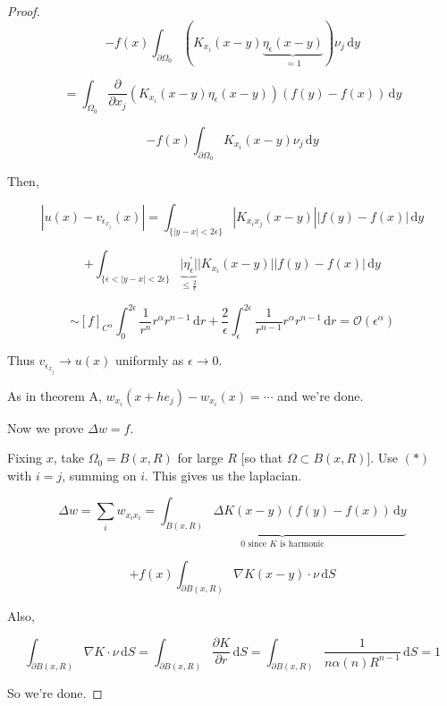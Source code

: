 \documentclass{article}
\theoremstyle{definition}
\begin{document}
\begin{proof}
    \[
        - f(x) \int_{\partial \Omega_0} (K_{x_i}(x-y) \underbrace{ \eta_{\epsilon} (x-y) }_{=1}) \nu_j \,\mathrm{d}y
    \]

    \[
        =\int_{\Omega_0} \frac{\partial}{\partial x_j} \left( K_{x_i} (x-y) \eta_{\epsilon} (x-y) \right) (f(y) - f(x)) \,\mathrm{d}y 
    \]

    \[
        - f(x) \int_{\partial \Omega_0} K_{x_i}(x-y)\nu_j \,\mathrm{d}y
    \]

    Then,

    \[
        \left\vert u(x) - v_{\epsilon_{x_j}} (x) \right\vert = \int_{\{ \vert y - x \vert < 2 \epsilon \} } \left\vert K_{x_i x_j} (x-y) \right\vert \left\vert f(y) - f(x) \right\vert  \,\mathrm{d}y 
    \]

    \[
        + \int_{\{ \epsilon < \vert y - x \vert < 2 \epsilon \} } \underbrace{\vert \eta_{\epsilon} ^{\prime} \vert}_{\leq \frac{2}{\epsilon}} \vert K_{x_i} (x-y) \vert \vert f(y) - f(x) \vert \,\mathrm{d}y 
    \]

    \[
        \sim [f]_{C^\alpha} \int_{0}^{2\epsilon} \frac{1}{r^n} r^\alpha r^{n-1} \,\mathrm{d}r + \frac{2}{\epsilon} \int_{\epsilon}^{2\epsilon} \frac{1}{r^{n-1}} r^\alpha r^{n-1}  \,\mathrm{d}r = \mathcal{O} (\epsilon^\alpha)
    \]

    Thus \(v_{\epsilon_{x_j}} \to u(x) \) uniformly as \(\epsilon \to 0\).
    
    As in theorem A, \(w_{x_i} (x+ he_j) - w_{x_i} (x) = \cdots\) and we're done.

    Now we prove \(\Delta w = f\).

    Fixing \(x\), take \(\Omega_0 = B(x,R)\) for large \(R\) [so that \(\Omega \subset B(x,R)\)]. Use \((\ast)\) with \(i = j\), summing on \(i\). This gives us the laplacian.

    \[
        \Delta w = \sum_{i} w_{x_i x_i} = \underbrace{\int_{B(x,R)} \Delta K(x-y) (f(y) - f(x)) \,\mathrm{d}y}_{0 \text{ since \(K\) is harmonic}}  
    \]

    \[
        + f(x) \int_{\partial B(x,R)} \nabla K(x-y) \cdot \nu \,\mathrm{d}S 
    \]

    Also,

    \[
        \int_{\partial B(x,R)} \nabla K \cdot \nu \,\mathrm{d}S = \int_{\partial B(x,R)} \frac{\partial K}{\partial r} \,\mathrm{d}S = \int_{\partial B(x,R)} \frac{1}{n \alpha (n) R^{n-1}} \,\mathrm{d}S = 1
    \]

    So we're done.

\end{proof}
\end{document}
